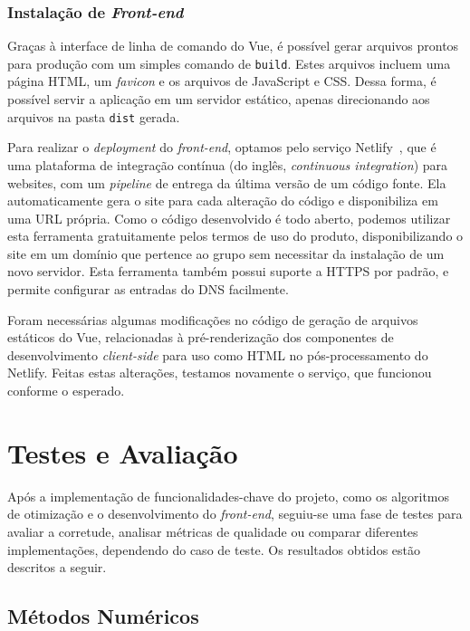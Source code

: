 \documentclass[]{politex}
\begin{document}
\subsection{Instalação de \textit{Front-end}}

Graças à interface de linha de comando do Vue, é possível gerar arquivos prontos
para produção com um simples comando de \texttt{build}. Estes arquivos incluem
uma página HTML, um \textit{favicon} e os arquivos de JavaScript e CSS. Dessa
forma, é possível servir a aplicação em um servidor estático, apenas
direcionando aos arquivos na pasta \texttt{dist} gerada.

Para realizar o \textit{deployment} do \textit{front-end}, optamos pelo serviço
Netlify~\cite{netlify}, que é uma plataforma de integração contínua (do inglês,
\textit{continuous integration}) para websites, com um \textit{pipeline} de
entrega da última versão de um código fonte. Ela automaticamente gera o site
para cada alteração do código e disponibiliza em uma URL própria. Como o código
desenvolvido é todo aberto, podemos utilizar esta ferramenta gratuitamente pelos
termos de uso do produto, disponibilizando o site em um domínio que pertence ao
grupo sem necessitar da instalação de um novo servidor. Esta ferramenta também
possui suporte a HTTPS por padrão, e permite configurar as entradas do DNS
facilmente.

Foram necessárias algumas modificações no código de geração de arquivos
estáticos do Vue, relacionadas à pré-renderização dos componentes de
desenvolvimento \textit{client-side} para uso como HTML no pós-processamento do
Netlify. Feitas estas alterações, testamos novamente o serviço, que funcionou
conforme o esperado.

\chapter{Testes e Avaliação}

Após a implementação de funcionalidades-chave do projeto, como os algoritmos de
otimização e o desenvolvimento do \textit{front-end}, seguiu-se uma fase de
testes para avaliar a corretude, analisar métricas de qualidade ou comparar
diferentes implementações, dependendo do caso de teste. Os resultados obtidos
estão descritos a seguir.

\section{Métodos Numéricos}
\end{document}
